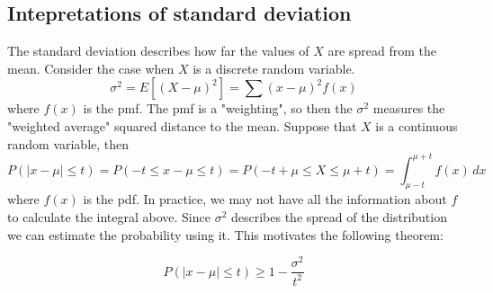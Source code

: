 \documentclass[11pt]{article}
\begin{document}
\subsection{Intepretations of standard deviation}
\begin{remark}   
     The standard deviation describes how far the values of $X$ are spread from the mean. Consider the case when $X$ is a discrete random variable.
        \[
            \sigma^2 = E[(X-\mu)^2] = \sum (x-\mu)^2 f(x)
        \]
    where $f(x)$ is the pmf. The pmf is a "weighting", so then the $\sigma^2$ measures the "weighted average" squared distance to the mean. 
    Suppose that $X$ is a continuous random variable, then 
        \[
            P(|x-\mu|\le t) = P(-t \le x-\mu \le t) = P(-t+\mu \le X \le \mu+t) = \int_{\mu-t}^{\mu+t} f(x)\, dx
        \] 
        where $f(x)$ is the pdf. In practice, we may not have all the information about $f$ to calculate the integral above. 
        Since $\sigma^2$ describes the spread of the distribution we can estimate the probability using it.
        This motivates the following theorem:
\end{remark}
\begin{theorem}
    \[
        P(|x-\mu| \le t) \ge 1 - \frac{\sigma^2}{t^2}
    \]
\end{theorem}
\end{document}
